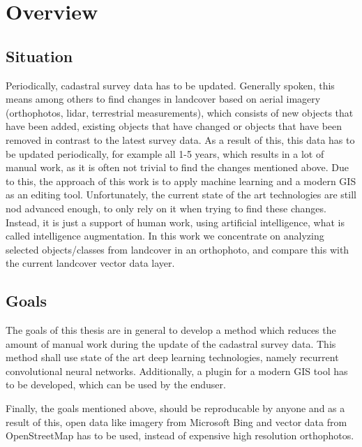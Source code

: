 
\chapter{Overview}\label{chp:overview}
\section{Situation}
Periodically, cadastral survey data has to be updated. Generally spoken, this means among others to find changes in landcover based on aerial imagery (orthophotos, lidar, terrestrial measurements), which consists of new objects that have been added, existing objects that have changed or objects that have been removed in contrast to the latest survey data. As a result of this, this data has to be updated periodically, for example all 1-5 years, which results in a lot of manual work, as it is often not trivial to find the changes mentioned above. Due to this, the approach of this work is to apply machine learning and a modern GIS as an editing tool. Unfortunately, the current state of the art technologies are still nod advanced enough, to only rely on it when trying to find these changes. Instead, it is just a support of human work, using artificial intelligence, what is called intelligence augmentation. In this work we concentrate on analyzing selected objects/classes from landcover in an orthophoto, and compare this with the current landcover vector data layer.

\section{Goals}
The goals of this thesis are in general to develop a method which reduces the amount of manual work during the update of the cadastral survey data. This method shall use state of the art deep learning technologies, namely recurrent convolutional neural networks. Additionally, a plugin for a modern GIS tool has to be developed, which can be used by the enduser.

Finally, the goals mentioned above, should be reproducable by anyone and as a result of this, open data like imagery from Microsoft Bing and vector data from OpenStreetMap has to be used, instead of expensive high resolution orthophotos.

